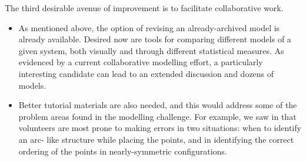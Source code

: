 The third desirable avenue of improvement is to facilitate
collaborative work.

\begin{itemize}
\item As mentioned above, the option of revising an already-archived
  model is already available.  Desired now are tools for comparing
  different models of a given system, both visually and through
  different statistical measures.  As evidenced by a current
  collaborative modelling effort, a particularly interesting candidate
  can lead to an extended discussion and dozens of models.
\item Better tutorial materials are also needed, and this would
  address some of the problem areas found in the modelling challenge.
  For example, we saw in  that volunteers are most
  prone to making errors in two situations: when to identify an arc-
  like structure while placing the points, and in identifying the
  correct ordering of the points in nearly-symmetric configurations.
\end{itemize}

